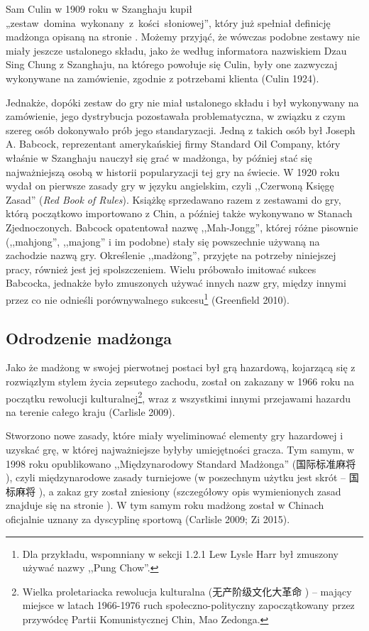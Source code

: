 Sam Culin w 1909 roku w Szanghaju kupił \mbox{„zestaw
domina wykonany z kości słoniowej”,} który już spełniał definicję madżonga
opisaną na stronie \pageref{definicja}. Możemy przyjąć, że wówczas podobne
zestawy nie miały jeszcze ustalonego składu, jako że według informatora nazwiskiem Dzau Sing
Chung z Szanghaju, na którego powołuje się Culin, były one
zazwyczaj wykonywane na zamówienie, zgodnie z potrzebami klienta (Culin 1924).

Jednakże, dopóki zestaw do gry nie miał ustalonego składu i był wykonywany na
zamówienie, jego dystrybucja pozostawała problematyczna, w związku z czym szereg
osób dokonywało prób jego standaryzacji. Jedną z takich osób był Joseph A.
Babcock, reprezentant amerykańskiej firmy Standard Oil Company, który właśnie w
Szanghaju nauczył się grać w madżonga, by później
stać się najważniejszą osobą w historii popularyzacji tej gry na świecie. W
1920 roku wydał on pierwsze zasady gry w języku
angielskim, czyli ,,Czerwoną Księgę Zasad'' (\textit{Red Book of Rules}).
Książkę sprzedawano razem z zestawami do gry, którą początkowo importowano z
Chin, a później także wykonywano w Stanach Zjednoczonych. Babcock opatentował
nazwę ,,Mah-Jongg'', której różne pisownie (,,mahjong'', ,,majong'' i im
podobne) stały się powszechnie używaną na zachodzie nazwą gry. Określenie
,,madżong'', przyjęte na potrzeby niniejszej pracy, również jest jej
spolszczeniem. Wielu próbowało imitować sukces Babcocka, jednakże było
zmuszonych używać innych nazw gry, między innymi przez co nie odnieśli
porównywalnego sukcesu\footnote{Dla przykładu, wspomniany w sekcji 1.2.1 Lew
Lysle Harr był zmuszony używać nazwy ,,Pung Chow''.} (Greenfield 2010).

\subsection{Odrodzenie madżonga}
\label{zakaz_1966}
Jako że madżong w swojej pierwotnej postaci był grą hazardową, kojarzącą się z
rozwiązłym stylem życia zepsutego zachodu, został on zakazany w 1966 roku na
początku rewolucji kulturalnej\footnote{Wielka proletariacka rewolucja
kulturalna (无产阶级文化大革命   ) --
mający miejsce w latach 1966-1976 ruch społeczno-polityczny zapoczątkowany przez
przywódcę Partii Komunistycznej Chin, Mao Zedonga.}, wraz z wszystkimi innymi
przejawami hazardu na terenie całego kraju (Carlisle 2009).

\label{relegalizacja}
Stworzono nowe zasady, które miały wyeliminować elementy gry hazardowej i
uzyskać grę, w której najważniejsze byłyby umiejętności gracza. Tym samym, w
1998 roku opublikowano ,,Międzynarodowy Standard Madżonga'' (国际标准麻将
), czyli międzynarodowe zasady turniejowe (w
poszechnym użytku jest skrót -- 国标麻将  ), a zakaz
gry został zniesiony (szczegółowy opis wymienionych zasad znajduje się na stronie
\pageref{guobiao}).
W tym samym roku madżong został w Chinach oficjalnie uznany za dyscyplinę sportową (Carlisle 2009; Zi 2015).

